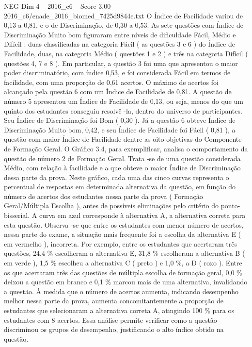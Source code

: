 \begin{textsample}{NEG Dim 4 – 2016\_c6 – Score 3.00 – 2016\_c6/enade\_2016\_biomed\_7425d9844e.txt}
O Índice de Facilidade variou de 0,13 a 0,81, e o de Discriminação, de 0,30 a 0,53.
As sete questões com Índice de Discriminação Muito bom figuraram entre níveis de dificuldade Fácil, Médio e Difícil : duas classificadas na categoria Fácil ( as questões 3 e 6 ) do Índice de Facilidade, duas, na categoria Médio ( questões 1 e 2 ) e três na categoria Difícil ( questões 4, 7 e 8 ).
Em particular, a questão 3 foi uma que apresentou o maior poder discriminatório, com índice 0,53, e foi considerada Fácil em termos de facilidade, com uma proporção de 0,61 acertos.
O máximo de acertos foi alcançado pela questão 6 com um Índice de Facilidade de 0,81.
A questão de número 5 apresentou um Índice de Facilidade de 0,13, ou seja, menos do que um quinto dos estudantes conseguiu resolvê -la, dentro do universo de participantes.
Seu Índice de Discriminação foi Bom ( 0,30 ).
Já a questão 6 obteve Índice de Discriminação Muito bom, 0,42, e seu Índice de Facilidade foi Fácil ( 0,81 ), a questão com maior Índice de Facilidade dentre as oito objetivas do Componente de Formação Geral.
O Gráfico 3.4, para exemplificar, analisa o comportamento da questão de número 2 de Formação Geral.
Trata -se de uma questão considerada Médio, com relação à facilidade e a que obteve o maior Índice de Discriminação dessa parte da prova.
Neste gráfico, cada uma das cinco curvas representa o percentual de respostas em determinada alternativa da questão, em função do número de acertos dos estudantes nessa parte da prova ( Formação Geral/Múltipla Escolha ), antes de possíveis eliminações pelo critério do ponto-bisserial.
A curva em azul corresponde à alternativa A, a alternativa correta para esta questão.
Observa -se que entre os estudantes com menor número de acertos, nessa parte do exame, a situação mais frequente foi a escolha da alternativa E ( em vermelho ), incorreta.
Por exemplo, entre os estudantes que acertaram três questões, 24,4 \% escolheram a alternativa E, 31,8 \% escolheram a alternativa B ( em verde ), 1,5 \% escolheu a alternativa C ( preto ) e 1,0 \%, a D ( roxo ).
Entre os que acertaram três das questões de múltipla escolha de formação geral, 0,0 \% deixou a questão em branco e 0,1 \% marcou mais de uma alternativa, invalidando a questão.
À medida que o número de acertos aumenta, indicando desempenho melhor nessa parte da prova, aumenta concomitantemente a proporção de estudantes que selecionaram a alternativa correta A, atingindo 100 \% para os estudantes com 8 acertos.
Essa análise permite verificar como a questão discriminou os grupos de desempenho, justificando o alto índice obtido na questão.

\end{textsample}
